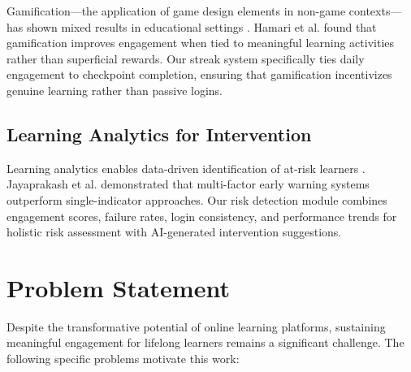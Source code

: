 \documentclass[conference]{IEEEtran}
\begin{document}
Gamification---the application of game design elements in non-game contexts---has shown mixed results in educational settings \cite{b19}. Hamari et al. \cite{b20} found that gamification improves engagement when tied to meaningful learning activities rather than superficial rewards. Our streak system specifically ties daily engagement to checkpoint completion, ensuring that gamification incentivizes genuine learning rather than passive logins.

\subsection{Learning Analytics for Intervention}

Learning analytics enables data-driven identification of at-risk learners \cite{b21}. Jayaprakash et al. \cite{b22} demonstrated that multi-factor early warning systems outperform single-indicator approaches. Our risk detection module combines engagement scores, failure rates, login consistency, and performance trends for holistic risk assessment with AI-generated intervention suggestions.

\section{Problem Statement}

Despite the transformative potential of online learning platforms, sustaining meaningful engagement for lifelong learners remains a significant challenge. The following specific problems motivate this work:
\end{document}
